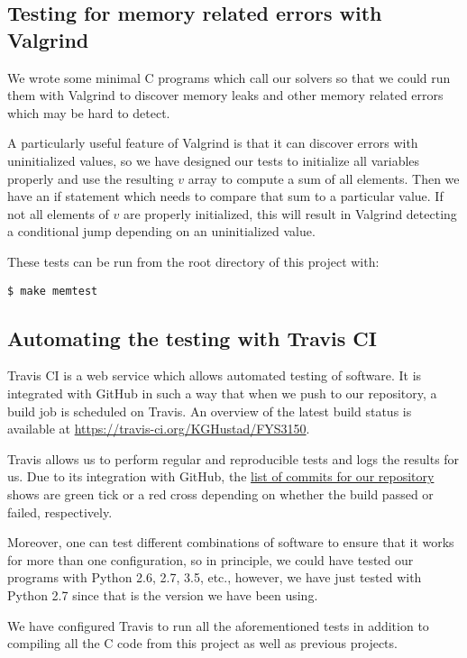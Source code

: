 \subsection{Testing for memory related errors with Valgrind}
\label{appx:testing:valgrind}
We wrote some minimal C programs which call our solvers so that we could run them with Valgrind to discover memory leaks and other memory related errors which may be hard to detect.

A particularly useful feature of Valgrind is that it can discover errors with uninitialized values, so we have designed our tests to initialize all variables properly and use the resulting $v$ array to compute a sum of all elements. Then we have an if statement which needs to compare that sum to a particular value. If not all elements of $v$ are properly initialized, this will result in Valgrind detecting a conditional jump depending on an uninitialized value.

These tests can be run from the root directory of this project with:

\begin{verbatim}
$ make memtest
\end{verbatim}

\subsection{Automating the testing with Travis CI}
\label{appx:testing:travis}
Travis CI is a web service which allows automated testing of software. It is integrated with GitHub in such a way that when we push to our repository, a build job is scheduled on Travis. An overview of the latest build status is available at \url{https://travis-ci.org/KGHustad/FYS3150}.

Travis allows us to perform regular and reproducible tests and logs the results for us. Due to its integration with GitHub, the \href{https://github.com/KGHustad/FYS3150/commits/master}{list of commits for our repository} shows are green tick or a red cross depending on whether the build passed or failed, respectively.

Moreover, one can test different combinations of software to ensure that it works for more than one configuration, so in principle, we could have tested our programs with Python 2.6, 2.7, 3.5, etc., however, we have just tested with Python 2.7 since that is the version we have been using.

We have configured Travis to run all the aforementioned tests in addition to compiling all the C code from this project as well as previous projects.
